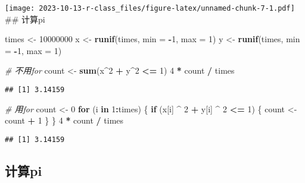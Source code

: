 \documentclass[
]{article}
\newenvironment{Shaded}{\begin{snugshade}}{\end{snugshade}}
\newcommand{\AttributeTok}[1]{\textcolor[rgb]{0.13,0.29,0.53}{#1}}
\newcommand{\CommentTok}[1]{\textcolor[rgb]{0.56,0.35,0.01}{\textit{#1}}}
\newcommand{\ControlFlowTok}[1]{\textcolor[rgb]{0.13,0.29,0.53}{\textbf{#1}}}
\newcommand{\DecValTok}[1]{\textcolor[rgb]{0.00,0.00,0.81}{#1}}
\newcommand{\FunctionTok}[1]{\textcolor[rgb]{0.13,0.29,0.53}{\textbf{#1}}}
\newcommand{\NormalTok}[1]{#1}
\newcommand{\OtherTok}[1]{\textcolor[rgb]{0.56,0.35,0.01}{#1}}
\newcommand{\SpecialCharTok}[1]{\textcolor[rgb]{0.81,0.36,0.00}{\textbf{#1}}}
\begin{document}
\texttt{[image: 2023-10-13-r-class\_files/figure-latex/unnamed-chunk-7-1.pdf]}
\#\# 计算pi

\begin{Shaded}
\begin{Highlighting}[]
\NormalTok{times }\OtherTok{\textless{}{-}} \DecValTok{10000000}
\NormalTok{x }\OtherTok{\textless{}{-}} \FunctionTok{runif}\NormalTok{(times, }\AttributeTok{min =} \SpecialCharTok{{-}}\DecValTok{1}\NormalTok{, }\AttributeTok{max =} \DecValTok{1}\NormalTok{)}
\NormalTok{y }\OtherTok{\textless{}{-}} \FunctionTok{runif}\NormalTok{(times, }\AttributeTok{min =} \SpecialCharTok{{-}}\DecValTok{1}\NormalTok{, }\AttributeTok{max =} \DecValTok{1}\NormalTok{)}

\CommentTok{\# 不用for}
\NormalTok{count }\OtherTok{\textless{}{-}} \FunctionTok{sum}\NormalTok{(x}\SpecialCharTok{\^{}}\DecValTok{2} \SpecialCharTok{+}\NormalTok{ y}\SpecialCharTok{\^{}}\DecValTok{2} \SpecialCharTok{\textless{}=} \DecValTok{1}\NormalTok{)}
\DecValTok{4} \SpecialCharTok{*}\NormalTok{ count }\SpecialCharTok{/}\NormalTok{ times}
\end{Highlighting}
\end{Shaded}

\begin{verbatim}
## [1] 3.14159
\end{verbatim}

\begin{Shaded}
\begin{Highlighting}[]
\CommentTok{\# 用for}
\NormalTok{count }\OtherTok{\textless{}{-}} \DecValTok{0}
\ControlFlowTok{for}\NormalTok{ (i }\ControlFlowTok{in} \DecValTok{1}\SpecialCharTok{:}\NormalTok{times) \{}
  \ControlFlowTok{if}\NormalTok{ (x[i] }\SpecialCharTok{\^{}} \DecValTok{2} \SpecialCharTok{+}\NormalTok{ y[i] }\SpecialCharTok{\^{}} \DecValTok{2} \SpecialCharTok{\textless{}=} \DecValTok{1}\NormalTok{) \{}
\NormalTok{    count }\OtherTok{\textless{}{-}}\NormalTok{ count }\SpecialCharTok{+} \DecValTok{1}
\NormalTok{  \}}
\NormalTok{\}}
\DecValTok{4} \SpecialCharTok{*}\NormalTok{ count }\SpecialCharTok{/}\NormalTok{ times}
\end{Highlighting}
\end{Shaded}

\begin{verbatim}
## [1] 3.14159
\end{verbatim}

\hypertarget{ux8ba1ux7b97pi}{%
\subsection{计算pi}\label{ux8ba1ux7b97pi}}
\end{document}
